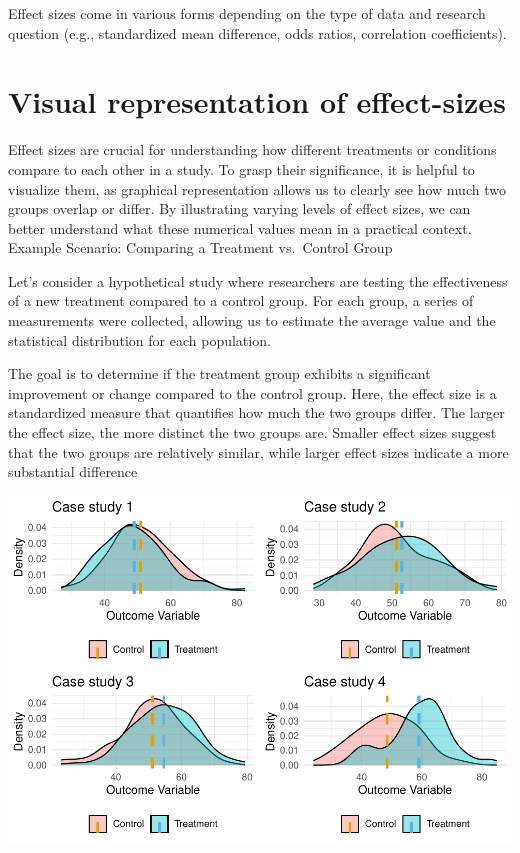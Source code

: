 \documentclass[
]{book}
\begin{document}
Effect sizes come in various forms depending on the type of data and research question (e.g., standardized mean difference, odds ratios, correlation coefficients).

\section{Visual representation of effect-sizes}\label{visual-representation-of-effect-sizes}

Effect sizes are crucial for understanding how different treatments or conditions compare to each other in a study.
To grasp their significance, it is helpful to visualize them, as graphical representation allows us to clearly see how much two groups overlap or differ.
By illustrating varying levels of effect sizes, we can better understand what these numerical values mean in a practical context.
Example Scenario: Comparing a Treatment vs.~Control Group

Let's consider a hypothetical study where researchers are testing the effectiveness of a new treatment compared to a control group.
For each group, a series of measurements were collected, allowing us to estimate the average value and the statistical distribution for each population.

The goal is to determine if the treatment group exhibits a significant improvement or change compared to the control group.
Here, the effect size is a standardized measure that quantifies how much the two groups differ.
The larger the effect size, the more distinct the two groups are.
Smaller effect sizes suggest that the two groups are relatively similar, while larger effect sizes indicate a more substantial difference

\includegraphics{_main_files/figure-latex/unnamed-chunk-1-1.pdf}
\end{document}
